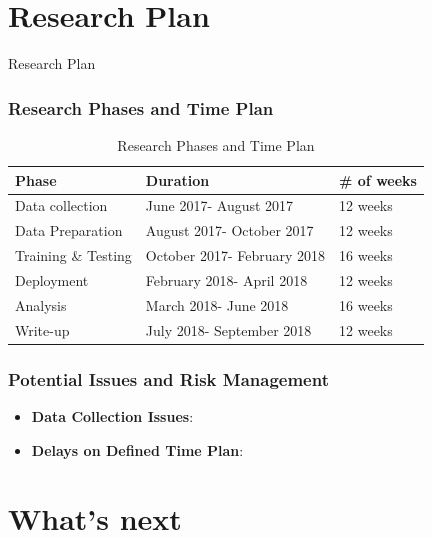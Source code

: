\documentclass{beamer}
\begin{document}
\section{Research Plan}

\begin{frame}
\Huge Research Plan
\end{frame}

\begin{frame}
\frametitle{Research Phases and Time Plan}

\begin{table}[h!]
	\centering
	\begin{center}
		\begin{tabular}{ | l | l | l |}
			\hline
			\textbf{Phase} & \textbf{Duration} & \textbf{\# of weeks} \\ \hline
			Data collection & June 2017- August 2017 & 12 weeks \\ \hline
			Data Preparation & August 2017- October 2017 & 12 weeks \\ \hline
			Training \& Testing & October 2017- February 2018 & 16 weeks \\ \hline
			Deployment & February 2018- April 2018 & 12 weeks \\ \hline
			Analysis & March 2018- June 2018 & 16 weeks \\ \hline			
			Write-up & July 2018- September 2018 & 12 weeks \\ \hline
			
		\end{tabular}
	\end{center}
	\caption{Research Phases and Time Plan}
	\label{timeplan}
\end{table}

\end{frame}

\begin{frame}
\frametitle{Potential Issues and Risk Management}
\begin{itemize}
	\item \textbf{Data Collection Issues}:
	\item \textbf{Delays on Defined Time Plan}:
\end{itemize}
\end{frame}
\section{What's next}
\end{document}

